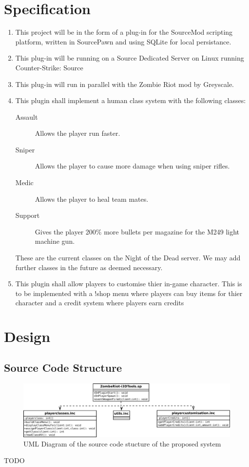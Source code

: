 \documentclass[a4paper, 11pt]{article}
\begin{document}
\section{Specification}
\begin{enumerate}
\item This project will be in the form of a plug-in for the SourceMod\cite{1} scripting platform, written in SourcePawn and using SQLite for local persistance.
\item This plug-in will be running on a Source Dedicated Server on Linux running Counter-Strike: Source
\item This plug-in will run in parallel with the Zombie Riot mod by Greyscale\cite{2}.
\item This plugin shall implement a human class system with the following classes:
\begin{description}
\item[Assault] Allows the player run faster.
\item[Sniper] Allows the player to cause more damage when using sniper rifles.
\item[Medic] Allows the player to heal team mates.
\item[Support] Gives the player 200\% more bullets per magazine for the M249 light machine gun.
\end{description}
These are the current classes on the Night of the Dead server. We may add further classes in the future as deemed necessary.
\item This plugin shall allow players to customise thier in-game character. This is to be implemented with a !shop menu where players can buy items for thier character and a credit system where players earn credits 
\end{enumerate}

\section{Design}

\subsection{Source Code Structure}
\begin{figure}[h!]
\includegraphics[width=\textwidth]{Design_UML.pdf}
\caption{UML Diagram of the source code stucture of the proposed system}
\end{figure}
TODO
\end{document}
